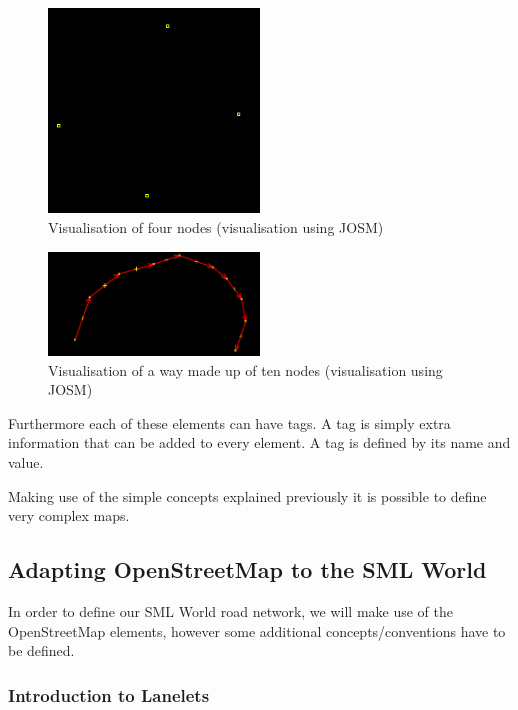 \begin{figure}[h!]
  \centering
    \includegraphics[width=0.5\textwidth]{osm_nodes}
    \caption{Visualisation of four nodes (visualisation using JOSM) \label{fig:osm_nodes} }
\end{figure}

\begin{figure}[h!]
    \centering
    \includegraphics[width=0.5\textwidth]{osm_way}
    \caption{Visualisation of a way made up of ten nodes (visualisation using JOSM) \label{fig:osm_way} }
\end{figure}

Furthermore each of these elements can have tags. A tag is simply extra information that can be added to every element. A tag is defined by its name and value.

Making use of the simple concepts explained previously it is possible to define very complex maps.

\subsection{Adapting OpenStreetMap to the SML World}

In order to define our SML World road network, we will make use of the OpenStreetMap elements, however some additional concepts/conventions have to be defined.

\subsubsection{Introduction to Lanelets}

